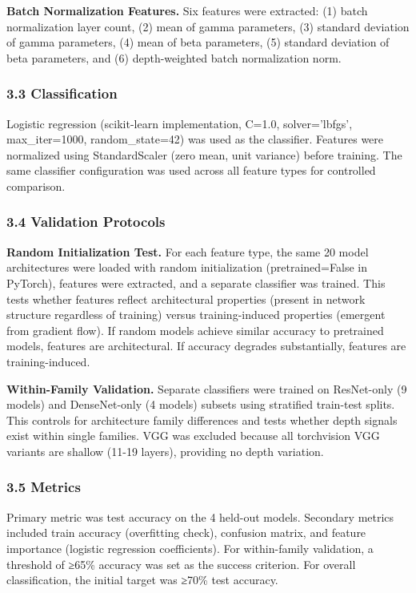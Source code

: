 \textbf{Batch Normalization Features.} Six features were extracted: (1) batch normalization layer count, (2) mean of gamma parameters, (3) standard deviation of gamma parameters, (4) mean of beta parameters, (5) standard deviation of beta parameters, and (6) depth-weighted batch normalization norm.

\subsubsection{3.3 Classification}

Logistic regression (scikit-learn implementation, C=1.0, solver='lbfgs', max_iter=1000, random_state=42) was used as the classifier. Features were normalized using StandardScaler (zero mean, unit variance) before training. The same classifier configuration was used across all feature types for controlled comparison.

\subsubsection{3.4 Validation Protocols}

\textbf{Random Initialization Test.} For each feature type, the same 20 model architectures were loaded with random initialization (pretrained=False in PyTorch), features were extracted, and a separate classifier was trained. This tests whether features reflect architectural properties (present in network structure regardless of training) versus training-induced properties (emergent from gradient flow). If random models achieve similar accuracy to pretrained models, features are architectural. If accuracy degrades substantially, features are training-induced.

\textbf{Within-Family Validation.} Separate classifiers were trained on ResNet-only (9 models) and DenseNet-only (4 models) subsets using stratified train-test splits. This controls for architecture family differences and tests whether depth signals exist within single families. VGG was excluded because all torchvision VGG variants are shallow (11-19 layers), providing no depth variation.

\subsubsection{3.5 Metrics}

Primary metric was test accuracy on the 4 held-out models. Secondary metrics included train accuracy (overfitting check), confusion matrix, and feature importance (logistic regression coefficients). For within-family validation, a threshold of ≥65\% accuracy was set as the success criterion. For overall classification, the initial target was ≥70\% test accuracy.
